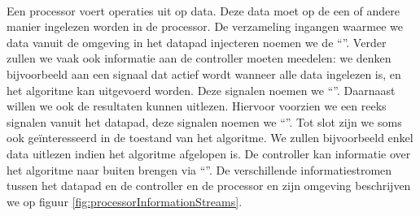 \paragraph{}
Een processor voert operaties uit op data. Deze data moet op de een of andere manier ingelezen worden in de processor. De verzameling ingangen waarmee we data vanuit de omgeving in het datapad injecteren noemen we de ``''. Verder zullen we vaak ook informatie aan de controller moeten meedelen: we denken bijvoorbeeld aan een signaal dat actief wordt wanneer alle data ingelezen is, en het algoritme kan uitgevoerd worden. Deze signalen noemen we ``''. Daarnaast willen we ook de resultaten kunnen uitlezen. Hiervoor voorzien we een reeks signalen vanuit het datapad, deze signalen noemen we ``''. Tot slot zijn we soms ook ge\"interesseerd in de toestand van het algoritme. We zullen bijvoorbeeld enkel data uitlezen indien het algoritme afgelopen is. De controller kan informatie over het algoritme naar buiten brengen via ``''. De verschillende informatiestromen tussen het datapad en de controller en de processor en zijn
omgeving beschrijven we op figuur \ref{fig:processorInformationStreams}.
